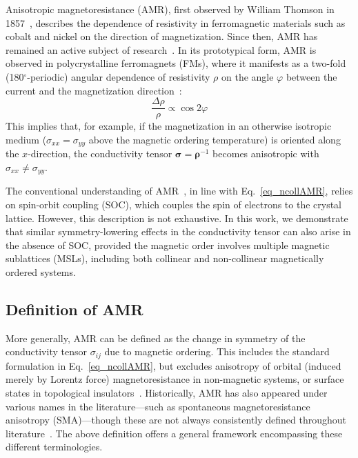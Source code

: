 \documentclass[prb,showpacs,amsmath,amssymb,superscriptaddress,twocolumn,floatfix]{revtex4-1}
\begin{document}
Anisotropic magnetoresistance (AMR), first observed by William Thomson in 1857~\cite{Thomson:1857}, describes the dependence of resistivity in ferromagnetic materials such as cobalt and nickel on the direction of magnetization. Since then, AMR has remained an active subject of research~\cite{Ritzinger:2023}. In its prototypical form, AMR is observed in polycrystalline ferromagnets (FMs), where it manifests as a two-fold (180$^\circ$-periodic) angular dependence of resistivity $\rho$ on the angle $\varphi$ between the current and the magnetization direction~\cite{Alagoz:2015}:
%
\begin{equation}
	\frac{\Delta \rho}{\rho} \propto \cos 2\varphi
	\label{eq_ncollAMR}
\end{equation}
%
This implies that, for example, if the magnetization in an otherwise isotropic medium ($\sigma_{xx} = \sigma_{yy}$ above the magnetic ordering temperature) is oriented along the $x$-direction, the conductivity tensor $\boldsymbol{\sigma} = \boldsymbol{\rho}^{-1}$ becomes anisotropic with $\sigma_{xx} \neq \sigma_{yy}$.

The conventional understanding of AMR~\cite{Vitayaya:2024}, in line with Eq.~\ref{eq_ncollAMR}, relies on spin-orbit coupling (SOC), which couples the spin of electrons to the crystal lattice. However, this description is not exhaustive. In this work, we demonstrate that similar symmetry-lowering effects in the conductivity tensor can also arise in the absence of SOC, provided the magnetic order involves multiple magnetic sublattices (MSLs), including both collinear and non-collinear magnetically ordered systems.

\subsection{Definition of AMR}

More generally, AMR can be defined as the change in symmetry of the conductivity tensor $\sigma_{ij}$ due to magnetic ordering. This includes the standard formulation in Eq.~\ref{eq_ncollAMR}, but excludes anisotropy of orbital (induced merely by Lorentz force) magnetoresistance in non-magnetic systems, or surface states in topological insulators~\cite{Ritzinger:2023}. Historically, AMR has also appeared under various names in the literature—such as spontaneous magnetoresistance anisotropy (SMA)—though these are not always consistently defined throughout literature~\cite{Ritzinger:2023}. The above definition offers a general framework encompassing these different terminologies.
\end{document}

